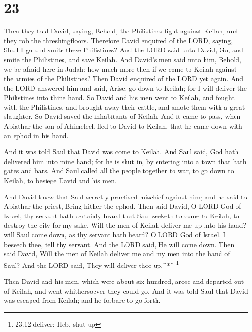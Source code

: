 \hypertarget{section-22}{%
\section{23}\label{section-22}}

 Then they told David, saying, Behold, the Philistines fight
against Keilah, and they rob the threshingfloors.  Therefore
David enquired of the LORD, saying, Shall I go and smite these
Philistines? And the LORD said unto David, Go, and smite the
Philistines, and save Keilah.  And David's men said unto
him, Behold, we be afraid here in Judah: how much more then if we come
to Keilah against the armies of the Philistines?  Then David
enquired of the LORD yet again. And the LORD answered him and said,
Arise, go down to Keilah; for I will deliver the Philistines into thine
hand.  So David and his men went to Keilah, and fought with
the Philistines, and brought away their cattle, and smote them with a
great slaughter. So David saved the inhabitants of Keilah. 
And it came to pass, when Abiathar the son of Ahimelech fled to David to
Keilah, that he came down with an ephod in his hand.

 And it was told Saul that David was come to Keilah. And
Saul said, God hath delivered him into mine hand; for he is shut in, by
entering into a town that hath gates and bars.  And Saul
called all the people together to war, to go down to Keilah, to besiege
David and his men.

 And David knew that Saul secretly practised mischief
against him; and he said to Abiathar the priest, Bring hither the ephod.
 Then said David, O LORD God of Israel, thy servant hath
certainly heard that Saul seeketh to come to Keilah, to destroy the city
for my sake.  Will the men of Keilah deliver me up into his
hand? will Saul come down, as thy servant hath heard? O LORD God of
Israel, I beseech thee, tell thy servant. And the LORD said, He will
come down.  Then said David, Will the men of Keilah deliver
me and my men into the hand of Saul? And the LORD said, They will
deliver thee up.\^{}*\^{} \footnote{23.12 deliver: Heb. shut up}

 Then David and his men, which were about six hundred,
arose and departed out of Keilah, and went whithersoever they could go.
And it was told Saul that David was escaped from Keilah; and he forbare
to go forth.

